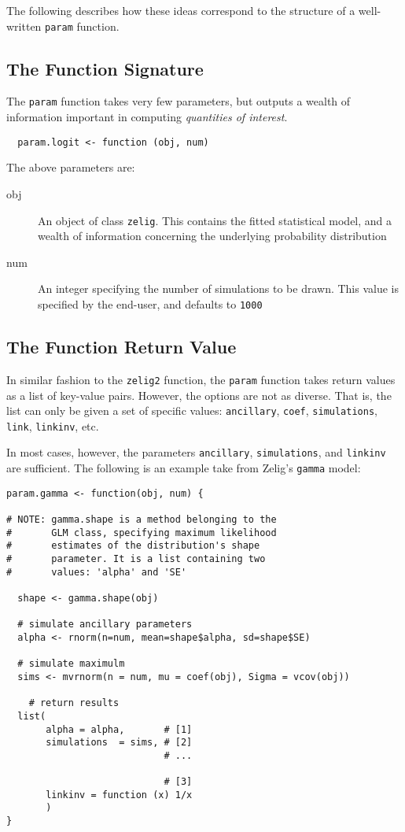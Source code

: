 \documentclass{article}
\newcommand{\code}[1]{{\tt #1}}
\begin{document}
The following describes how these ideas correspond to the structure of a well-written
\code{param} function.

\subsection{The Function Signature}

The \code{param} function takes very few parameters, but outputs a wealth of information important in computing \emph{quantities of interest}.

\begin{verbatim}
  param.logit <- function (obj, num)
\end{verbatim}

\noindent The above parameters are:

\begin{description}
	\item[obj] An object of class \code{zelig}. This contains the fitted statistical model,
		and a wealth of information concerning the underlying probability distribution
	\item[num] An integer specifying the number of simulations to be drawn. This value is specified by the end-user, and defaults to \code{1000}
\end{description}



\subsection{The Function Return Value}

In similar fashion to the \code{zelig2} function, the \code{param} function takes return
values as a list of key-value pairs. However, the options are not as diverse. That is, 
the list can only be given a set of specific values: \code{ancillary}, \code{coef},
\code{simulations}, \code{link}, \code{linkinv}, etc.

In most cases, however, the parameters \code{ancillary}, \code{simulations}, and \code{linkinv} are sufficient. The following is an example take from Zelig's \code{gamma} model:

\begin{verbatim}
param.gamma <- function(obj, num) {

# NOTE: gamma.shape is a method belonging to the
#       GLM class, specifying maximum likelihood
#       estimates of the distribution's shape
#       parameter. It is a list containing two
#       values: 'alpha' and 'SE'

  shape <- gamma.shape(obj)
	
  # simulate ancillary parameters
  alpha <- rnorm(n=num, mean=shape$alpha, sd=shape$SE)
  
  # simulate maximulm
  sims <- mvrnorm(n = num, mu = coef(obj), Sigma = vcov(obj))

	# return results  
  list(
       alpha = alpha,       # [1]
       simulations  = sims, # [2]
                            # ...
                               
                            # [3]
       linkinv = function (x) 1/x
       )
}

\end{verbatim}
\end{document}
